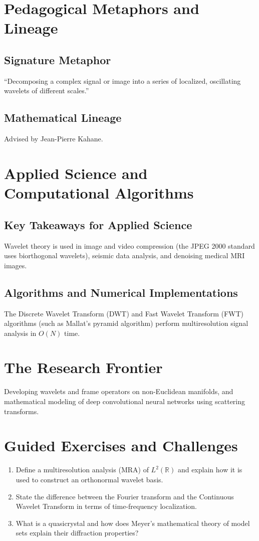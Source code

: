 \section{Pedagogical Metaphors and Lineage}
\subsection{Signature Metaphor}
``Decomposing a complex signal or image into a series of localized, oscillating wavelets of different scales.''

\subsection{Mathematical Lineage}
Advised by Jean-Pierre Kahane.

\section{Applied Science and Computational Algorithms}
\subsection{Key Takeaways for Applied Science}
Wavelet theory is used in image and video compression (the JPEG 2000 standard uses biorthogonal wavelets), seismic data analysis, and denoising medical MRI images.

\subsection{Algorithms and Numerical Implementations}
The Discrete Wavelet Transform (DWT) and Fast Wavelet Transform (FWT) algorithms (such as Mallat's pyramid algorithm) perform multiresolution signal analysis in $O(N)$ time.

\section{The Research Frontier}
Developing wavelets and frame operators on non-Euclidean manifolds, and mathematical modeling of deep convolutional neural networks using scattering transforms.

\section{Guided Exercises and Challenges}
\begin{enumerate}[label=\textbf{\arabic*.}]
  \item Define a multiresolution analysis (MRA) of $L^2(\mathbb{R})$ and explain how it is used to construct an orthonormal wavelet basis.
  \item State the difference between the Fourier transform and the Continuous Wavelet Transform in terms of time-frequency localization.
  \item What is a quasicrystal and how does Meyer's mathematical theory of model sets explain their diffraction properties?
\end{enumerate}

